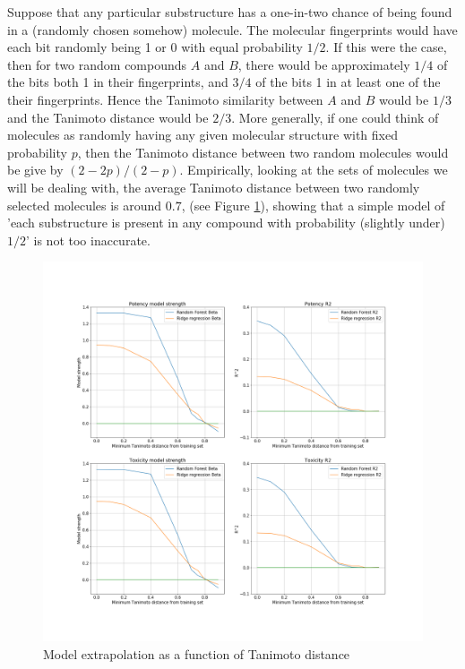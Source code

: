\documentclass[journal=jacsat,manuscript=article]{achemso}
\begin{document}
Suppose that any particular substructure has a one-in-two chance of being found in a (randomly chosen somehow) molecule.  The molecular fingerprints would have each bit randomly being 1 or 0 with equal probability $1/2$.  If this were the case, then for two random compounds $A$ and $B$, there would be approximately $1/4$ of the bits both 1 in their fingerprints, and $3/4$ of the bits 1 in at least one of the their fingerprints.  Hence the Tanimoto similarity between $A$ and $B$ would be $1/3$ and the Tanimoto distance would be $2/3$.  More generally, if one could think of molecules as randomly having any given molecular structure with fixed probability $p$, then the Tanimoto distance between two random molecules would be give by $(2-2p)/(2 - p)$.
\newline
\newline
Empirically, looking at the sets of molecules we will be dealing with, the average Tanimoto distance between two randomly selected molecules is around $0.7$, (see Figure \ref{fig:model_extrap}), showing that a simple model of 'each substructure is present in any compound with probability (slightly under) $1/2$' is not too inaccurate.

\begin{figure}[h!]
\centering
\includegraphics[width=\textwidth, keepaspectratio]{fig4_str_r2.png}
\caption{Model extrapolation as a function of Tanimoto distance}
\label{fig:model_extrap}
\end{figure}
\end{document}
